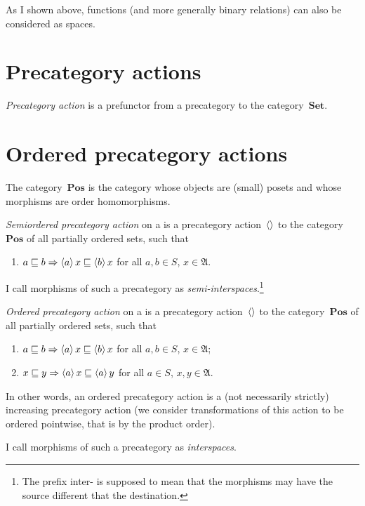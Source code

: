 As I shown above, functions (and more generally binary relations) can also be considered as spaces.

\chapter{Precategory actions}

\begin{defn}
\emph{Precategory action} is a prefunctor from a precategory to the category~$\mathbf{Set}$.
\end{defn}

\chapter{Ordered precategory actions}

The category~$\mathbf{Pos}$ is the category whose objects are (small) posets and whose morphisms are order homomorphisms.

\begin{defn}
\emph{Semiordered precategory action} on a is a precategory action~$\left\langle \right\rangle$ to the category~$\mathbf{Pos}$ of all partially ordered sets, such that
\begin{enumerate}
\item $a\sqsubseteq b\Rightarrow\left\langle a\right\rangle x\sqsubseteq \left\langle b\right\rangle x$ for all $a,b\in S$, $x\in\mathfrak{A}$.
\end{enumerate}
I call morphisms of such a precategory as \emph{semi-interspaces}.\footnote{The prefix inter- is supposed to mean that the morphisms may have the source different that the destination.}
\end{defn}

\begin{defn}
\emph{Ordered precategory action} on a is a precategory action~$\left\langle \right\rangle$ to the category~$\mathbf{Pos}$ of all partially ordered sets, such that
\begin{enumerate}
\item $a\sqsubseteq b\Rightarrow\left\langle a\right\rangle x\sqsubseteq \left\langle b\right\rangle x$ for all $a,b\in S$, $x\in\mathfrak{A}$;
\item $x\sqsubseteq y\Rightarrow\left\langle a\right\rangle x\sqsubseteq \left\langle a\right\rangle y$ for all $a\in S$, $x,y\in\mathfrak{A}$.
\end{enumerate}
In other words, an ordered precategory action is a (not necessarily strictly) increasing precategory action (we consider transformations of this action to be ordered pointwise, that is by the product order).

I call morphisms of such a precategory as \emph{interspaces}.
\end{defn}

